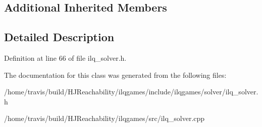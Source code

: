 \subsection*{Additional Inherited Members}


\subsection{Detailed Description}


Definition at line 66 of file ilq\+\_\+solver.\+h.



The documentation for this class was generated from the following files\+:\begin{DoxyCompactItemize}
\item 
/home/travis/build/\+H\+J\+Reachability/ilqgames/include/ilqgames/solver/ilq\+\_\+solver.\+h\item 
/home/travis/build/\+H\+J\+Reachability/ilqgames/src/ilq\+\_\+solver.\+cpp\end{DoxyCompactItemize}
